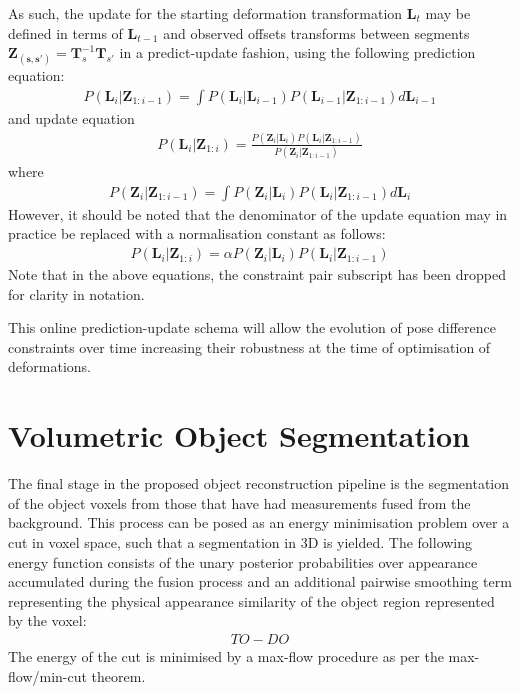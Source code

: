 As such, the update for the starting deformation transformation $\mathbf{L}_{t}$ may be defined in 
terms of $\mathbf{L}_{t-1}$ and observed offsets transforms between segments $\mathbf{Z_{(s, s')}} = \mathbf{T}_{s}^{-1}\mathbf{T}_{s'}$  in a predict-update fashion, using the following prediction equation:
\begin{equation}
\begin{split}
P(\mathbf{L}_{i} | \mathbf{Z}_{1:i-1}) = \int P(\mathbf{L}_{i} | \mathbf{L}_{i-1})P(\mathbf{L}_{i-1} | \mathbf{Z}_{1:i-1}) d\mathbf{L}_{i-1}
\end{split}
\end{equation}
and update equation
\begin{equation}
\begin{split}
P(\mathbf{L}_{i} | \mathbf{Z}_{1:i}) = \frac{P(\mathbf{Z}_{i} | \mathbf{L}_{i})P(\mathbf{L}_{i} | \mathbf{Z}_{1:i-1})}{P(\mathbf{Z}_{i} | \mathbf{Z}_{1:i-1})}
\end{split}
\end{equation}
where
\begin{equation}
\begin{split}
P(\mathbf{Z}_{i} | \mathbf{Z}_{1:i-1}) = \int P(\mathbf{Z}_{i} | \mathbf{L}_{i})P(\mathbf{L}_{i} | \mathbf{Z}_{1:i-1}) d\mathbf{L}_{i}
\end{split}
\end{equation}
However, it should be noted that the denominator of the update equation may in practice be replaced with a normalisation constant as follows:
\begin{equation}
\begin{split}
P(\mathbf{L}_{i} | \mathbf{Z}_{1:i}) = \alpha P(\mathbf{Z}_{i} | \mathbf{L}_{i})P(\mathbf{L}_{i} | \mathbf{Z}_{1:i-1})
\end{split}
\end{equation}
Note that in the above equations, the constraint pair subscript has been dropped for clarity in notation.

This online prediction-update schema will allow the evolution of pose difference constraints over time increasing their robustness at the time 
of optimisation of deformations.

\section{Volumetric Object Segmentation}
The final stage in the proposed object reconstruction pipeline is the segmentation of the object voxels from those that have had measurements fused 
from the background. This process can be posed as an energy minimisation problem over a cut in voxel space, such that a segmentation in 3D is yielded. The 
following energy function consists of the unary posterior probabilities over appearance accumulated during the fusion process and an additional pairwise 
smoothing term representing the physical appearance similarity of the object region represented by the voxel:
\begin{equation}
\begin{split}
TO-DO
\end{split}
\end{equation}
The energy of the cut is minimised by a max-flow procedure as per the max-flow/min-cut theorem.

